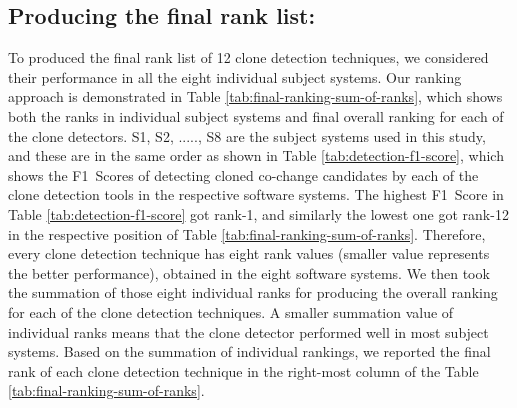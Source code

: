 \documentclass[review]{elsarticle}
\begin{document}
\subsection{Producing the final rank list:} To produced the final rank list of 12 clone detection techniques, we considered their performance in all the eight individual subject systems. Our ranking approach is demonstrated in Table \ref{tab:final-ranking-sum-of-ranks}, which shows both the ranks in individual subject systems and final overall ranking for each of the clone detectors. S1, S2, ....., S8 are the subject systems used in this study, and these are in the same order as shown in Table \ref{tab:detection-f1-score}, which shows the F1~Scores of detecting cloned co-change candidates by each of the clone detection tools in the respective software systems. The highest F1~Score in Table \ref{tab:detection-f1-score} got rank-1, and similarly the lowest one got rank-12 in the respective position of Table \ref{tab:final-ranking-sum-of-ranks}. Therefore, every clone detection technique has eight rank values (smaller value represents the better performance), obtained in the eight software systems. We then took the summation of those eight individual ranks for producing the overall ranking for each of the clone detection techniques. A smaller summation value of individual ranks means that the clone detector performed well in most subject systems. Based on the summation of individual rankings, we reported the final rank of each clone detection technique in the right-most column of the Table \ref{tab:final-ranking-sum-of-ranks}. 
\end{document}
